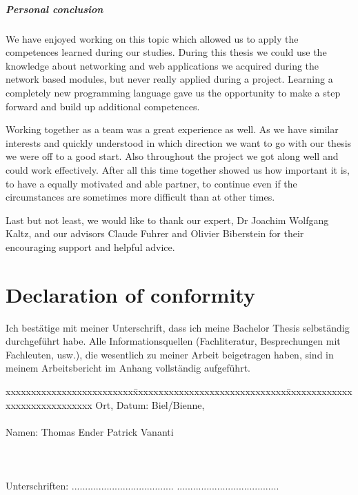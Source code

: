 \documentclass[
	a4paper,					10pt,							twoside,					openright,				notitlepage,			parskip=half,			]{scrreprt}
\begin{document}
\paragraph{Personal conclusion}
We have enjoyed working on this topic which allowed us to apply the competences learned during our studies. During this thesis we could 
use the knowledge about networking and web applications we acquired during the network based modules, but never really applied during 
a project. Learning a completely new programming language gave us the opportunity to make a step forward and build up additional competences.

Working together as a team was a great experience as well. As we have similar interests and quickly understood in which direction we want
to go with our thesis we were off to a good start. Also throughout the project we got along well and could work effectively. After all
this time together showed us how important it is, to have a equally motivated and able partner, to continue even if the circumstances are
sometimes more difficult than at other times.

Last but not least, we would like to thank our expert, Dr Joachim Wolfgang Kaltz, and our advisors Claude Fuhrer and Olivier Biberstein
for their encouraging support and helpful advice. 


\clearpage{}
\cleardoublepage
{} 
{}

{}
\cleardoublepage
{} 
{}
\clearpage{}\chapter*{Declaration of conformity}
\label{chap:selbstaendigkeitserklaerung}

\vspace*{10mm} 

Ich bestätige mit meiner Unterschrift, dass ich meine Bachelor Thesis selbständig durchgeführt habe.
Alle Informationsquellen (Fachliteratur, Besprechungen mit Fachleuten, usw.), die wesentlich zu
meiner Arbeit beigetragen haben, sind in meinem Arbeitsbericht im Anhang vollständig aufgeführt.

\vspace{15mm}

\begin{tabbing}
xxxxxxxxxxxxxxxxxxxxxxxxx\=xxxxxxxxxxxxxxxxxxxxxxxxxxxxxx\=xxxxxxxxxxxxxxxxxxxxxxxxxxxxxx\kill
Ort, Datum:		\> Biel/Bienne, \versiondate \\ \\ 
Namen:	\> Thomas Ender 	\> Patrick Vananti \\ \\ \\ \\ 
Unterschriften:	\> ......................................\> ...................................... \\
\end{tabbing}
\clearpage{}
\appendix
{}
\clearpage{}
\end{document}
